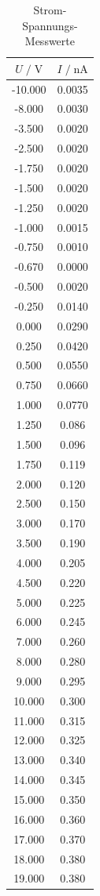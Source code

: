 \begin{table}
    \centering
    \caption{Strom-Spannungs-Messwerte}
    \label{tab:stsp}
    \begin{tabular}{c c}
    \toprule
    $ U \;/\; \si{\volt} $ & $I \;/\; \si{\nano\ampere}$\\
    \midrule 
      -10.000 & 0.0035\\
       -8.000 & 0.0030\\
       -3.500 & 0.0020\\
       -2.500 & 0.0020\\
       -1.750 & 0.0020\\
       -1.500 & 0.0020\\
       -1.250 & 0.0020\\
       -1.000 & 0.0015\\
       -0.750 & 0.0010\\
       -0.670 & 0.0000\\ 
       -0.500 & 0.0020\\
       -0.250 & 0.0140\\
        0.000 & 0.0290\\
        0.250 & 0.0420\\
        0.500 & 0.0550\\
        0.750 & 0.0660\\
        1.000 & 0.0770\\
        1.250 & 0.086\\
        1.500 & 0.096\\
        1.750 & 0.119\\
        2.000 & 0.120\\
        2.500 & 0.150\\
        3.000 & 0.170\\
        3.500 & 0.190\\
        4.000 & 0.205\\
        4.500 & 0.220\\
        5.000 & 0.225\\
        6.000 & 0.245\\
        7.000 & 0.260\\
        8.000 & 0.280\\
        9.000 & 0.295\\
       10.000 & 0.300\\
       11.000 & 0.315\\
       12.000 & 0.325\\
       13.000 & 0.340\\
       14.000 & 0.345\\
       15.000 & 0.350\\
       16.000 & 0.360\\
       17.000 & 0.370\\
       18.000 & 0.380\\
       19.000 & 0.380\\
       \bottomrule
    \end{tabular}
\end{table}

